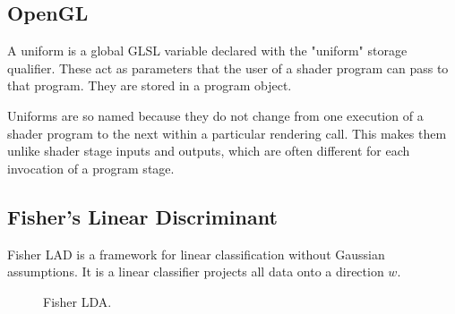 \subsection{OpenGL}
A uniform is a global GLSL variable declared with the "uniform" storage qualifier. These act as parameters that the user of a shader program can pass to that program. They are stored in a program object. 

Uniforms are so named because they do not change from one execution of a shader program to the next within a particular rendering call. This makes them unlike shader stage inputs and outputs, which are often different for each invocation of a program stage.


\subsection{Fisher's Linear Discriminant}
 Fisher LAD is a framework for linear classification without Gaussian assumptions. It is a linear classifier projects all data onto a direction $w$.

\begin{figure}[h]
	\caption{Fisher LDA.}
\end{figure}

